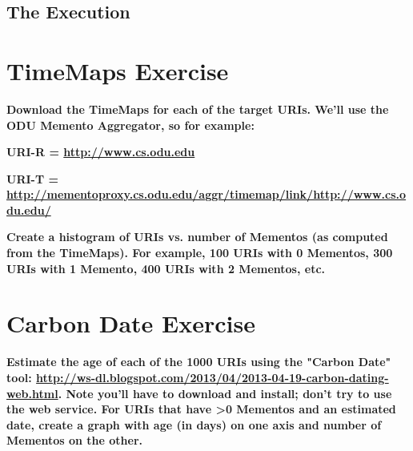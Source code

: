 \documentclass{article}
\begin{document}
\subsection*{The Execution}




\begin{figure}[H]
\centering
\caption{}
\label{turtle}
\end{figure}

\newpage

\section{TimeMaps Exercise}
\textbf{Download the TimeMaps for each of the target URIs. We'll use the ODU Memento Aggregator, so for example:}

\textbf{URI-R = \url{http://www.cs.odu.edu}}

\textbf{URI-T = \url{http://mementoproxy.cs.odu.edu/aggr/timemap/link/http://www.cs.odu.edu/}}

\textbf{Create a histogram of URIs vs. number of Mementos (as computed from the TimeMaps). For example, 100 URIs with 0 Mementos, 300 URIs with 1 Memento, 400 URIs with 2 Mementos, etc.}






\newpage

\section{Carbon Date Exercise}
\textbf{Estimate the age of each of the 1000 URIs using the "Carbon Date" tool: \url{http://ws-dl.blogspot.com/2013/04/2013-04-19-carbon-dating-web.html}. Note you'll have to download and install; don't try to use the web service. For URIs that have \textgreater  0 Mementos and an estimated date, create a graph with age (in days) on one axis and number of Mementos on the other.}

\begin{verbatim}

\end{verbatim}



\end{document}
